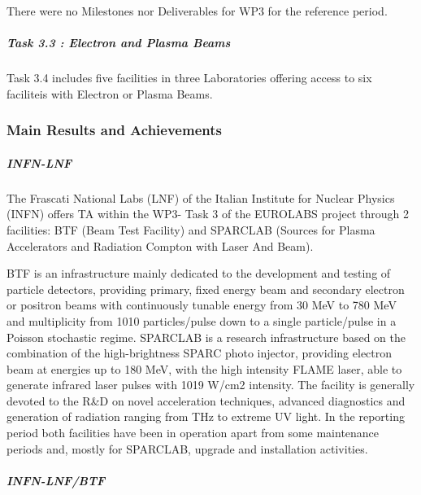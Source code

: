 There were no Milestones nor Deliverables for WP3 for the reference period. 

\subparagraph{Task 3.3 : Electron and Plasma Beams} \mbox{}


Task 3.4 includes five facilities in three Laboratories offering access to six faciliteis with Electron or Plasma Beams.  

\subsubsection*{Main Results and Achievements}


\subparagraph{INFN-LNF}

The Frascati National Labs (LNF) of the Italian Institute for Nuclear Physics (INFN) offers TA within the WP3- Task 3 of the EUROLABS project through 2 facilities: BTF (Beam Test Facility) and SPARCLAB (Sources for Plasma Accelerators and Radiation Compton with Laser And Beam).

BTF is an infrastructure mainly dedicated to the development and testing of particle detectors, providing primary, fixed energy beam and secondary electron or positron beams with continuously tunable energy from 30 MeV to 780 MeV and multiplicity from 1010 particles/pulse down to a single particle/pulse in a Poisson stochastic regime.
SPARCLAB is a research infrastructure based on the combination of the high-brightness SPARC photo injector, providing electron beam at energies up to 180 MeV, with the high intensity FLAME laser, able to generate infrared laser pulses with 1019 W/cm2 intensity. The facility is generally devoted to the R&D on novel acceleration techniques, advanced diagnostics and generation of radiation ranging from THz to extreme UV light. 
In the reporting period both facilities have been in operation apart from some maintenance periods and, mostly for SPARCLAB, upgrade and installation activities.

\subparagraph{INFN-LNF/BTF}

